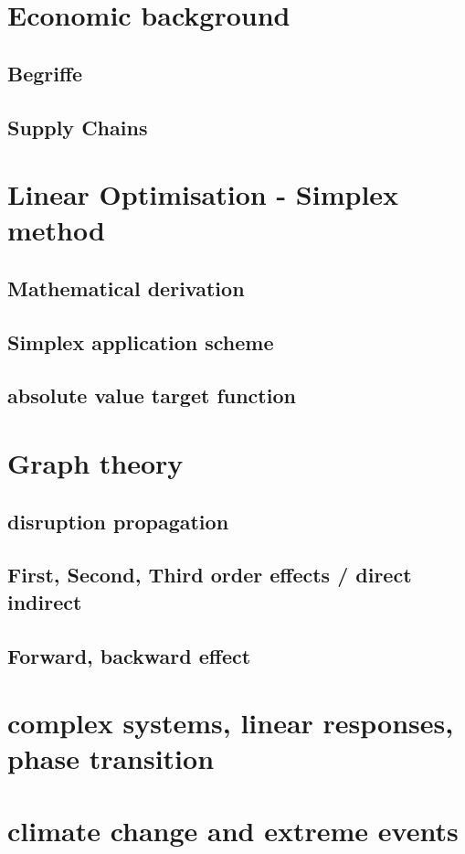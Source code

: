 \section{Economic background}


\subsection{Begriffe}


\subsection{Supply Chains}


\section{Linear Optimisation - Simplex method}


\subsection{Mathematical derivation}


\subsection{Simplex application scheme}

\subsection{absolute value target function}


\section{Graph theory}

\subsection{disruption propagation}

\subsection{First, Second, Third order effects / direct indirect}

\subsection{Forward, backward effect}


\section{complex systems, linear responses, phase transition}


\section{climate change and extreme events}